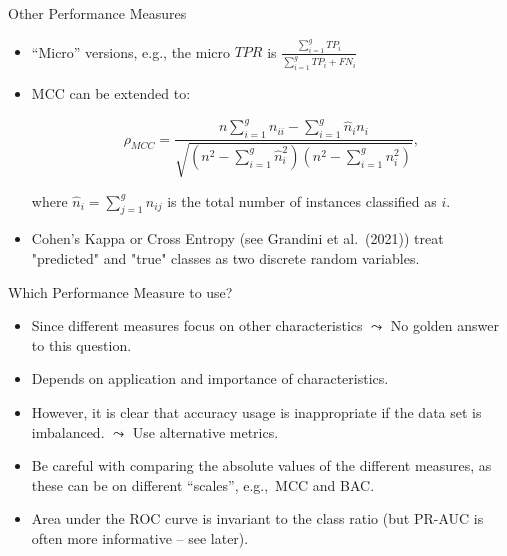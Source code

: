 \documentclass[11pt,compress,t,notes=noshow, xcolor=table]{beamer}
\begin{document}
\begin{frame}{Other Performance Measures}

	\small{

		\begin{itemize}
		
			\item ``Micro'' versions, e.g., the micro $TPR$ is $\frac{\sum_{i=1}^g TP_i}{\sum_{i=1}^g TP_i + FN_i}$ 
            \vspace{10pt}
		
			\item MCC can be extended to:
			
			$$   \rho_{MCC} = \frac{ n  \sum_{i=1}^g n_{ii} -  \sum_{i=1}^g \hat n_i n_i}{\sqrt{ (n^2 - \sum_{i=1}^g \hat n_i^2)(n^2 - \sum_{i=1}^g n_i^2)  }},$$

			where $\hat n_i = \sum_{j=1}^g n_{ij}$ is the total number of instances classified as $i.$
            \vspace{10pt}
        
		
			\item Cohen's Kappa or Cross Entropy (see Grandini et al.\ (2021)) treat "predicted" and "true" classes as two discrete random variables.
		
		\end{itemize}
	}
\end{frame}


\begin{frame}{Which Performance Measure to use?}

	\small{

		\begin{itemize}

            \item Since different measures focus on other characteristics $\leadsto$ No golden answer to this question.
	
			\item Depends on application and importance of characteristics.

			\item However, it is clear that accuracy usage is inappropriate if the data set is imbalanced. $\leadsto$ Use alternative metrics.

			\item Be careful with comparing the absolute values of the different measures, as these can be on different ``scales'', e.g.,\ MCC and BAC. 

                \item Area under the ROC curve is invariant to the class ratio (but PR-AUC is often more informative -- see later).
	
		\end{itemize}
	}
\end{frame}
\end{document}
